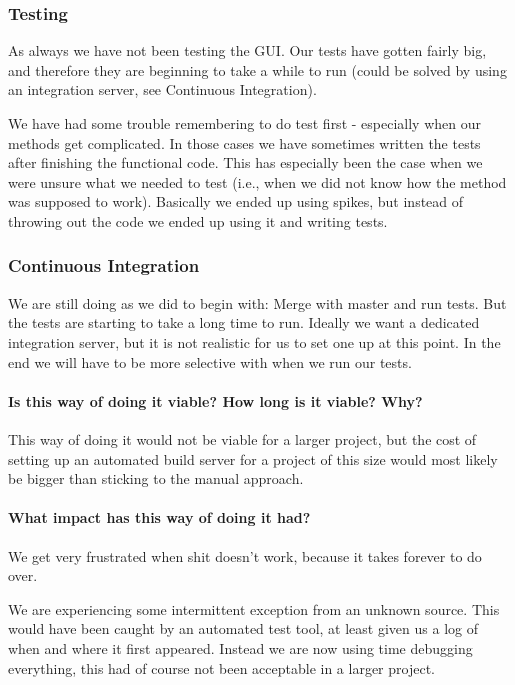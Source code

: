 \subsubsection{Testing}
As always we have not been testing the GUI. Our tests have gotten fairly big, and therefore they are beginning to take a while to run (could be solved by using an integration server, see Continuous Integration).

We have had some trouble remembering to do test first - especially when our methods get complicated. In those cases we have sometimes written the tests after finishing the functional code. This has especially been the case when we were unsure what we needed to test (i.e., when we did not know how the method was supposed to work). Basically we ended up using spikes, but instead of throwing out the code we ended up using it and writing tests. 

\subsubsection{Continuous Integration}
We are still doing as we did to begin with: Merge with master and run tests. But the tests are starting to take a long time to run. Ideally we want a dedicated integration server, but it is not realistic for us to set one up at this point. In the end we will have to be more selective with when we run our tests.

\paragraph{Is this way of doing it viable? How long is it viable? Why?}
This way of doing it would not be viable for a larger project, but the cost of setting up an automated build server for a project of this size would most likely be bigger than sticking to the manual approach.

\paragraph{What impact has this way of doing it had?}
We get very frustrated when shit doesn't work, because it takes forever to do over. 

We are experiencing some intermittent exception from an unknown source. This would have been caught by an automated test tool, at least given us a log of when and where it first appeared. Instead we are now using time debugging everything, this had of course not been acceptable in a larger project.
